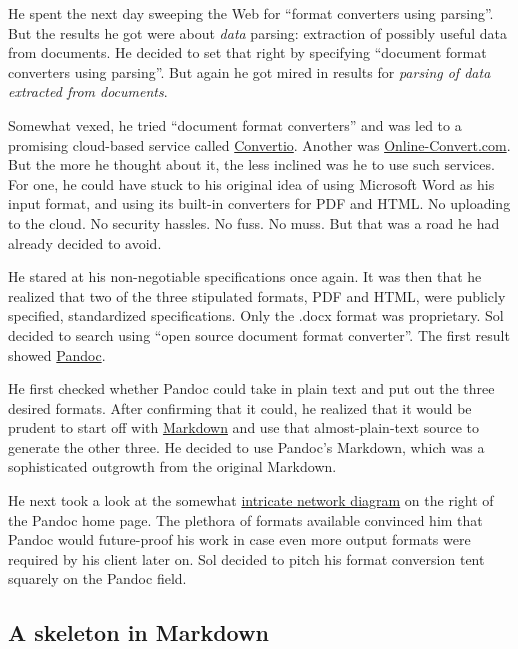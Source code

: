\documentclass[
  british,
  a4paper,
  rgb,
  dvipsnames,
  svgnames,
  hyphens]{article}
\begin{document}
He spent the next day sweeping the Web for ``format converters using
parsing''. But the results he got were about \emph{data} parsing:
extraction of possibly useful data from documents. He decided to set
that right by specifying ``document format converters using parsing''.
But again he got mired in results for \emph{parsing of data extracted
from documents}.

Somewhat vexed, he tried ``document format converters'' and was led to a
promising cloud-based service called
\href{https://convertio.co/document-converter/}{Convertio}. Another was
\href{https://document.online-convert.com/}{Online-Convert.com}. But the
more he thought about it, the less inclined was he to use such services.
For one, he could have stuck to his original idea of using Microsoft
Word as his input format, and using its built-in converters for PDF and
HTML. No uploading to the cloud. No security hassles. No fuss. No muss.
But that was a road he had already decided to avoid.

He stared at his non-negotiable specifications once again. It was then
that he realized that two of the three stipulated formats, PDF and HTML,
were publicly specified, standardized specifications. Only the .docx
format was proprietary. Sol decided to search using ``open source
document format converter''. The first result showed
\href{https://pandoc.org/}{Pandoc}.

He first checked whether Pandoc could take in plain text and put out the
three desired formats. After confirming that it could, he realized that
it would be prudent to start off with
\href{https://daringfireball.net/projects/markdown/}{Markdown} and use
that almost-plain-text source to generate the other three. He decided to
use Pandoc's Markdown, which was a sophisticated outgrowth from the
original Markdown.

He next took a look at the somewhat
\href{https://pandoc.org/diagram.svg}{intricate network diagram} on the
right of the Pandoc home page. The plethora of formats available
convinced him that Pandoc would future-proof his work in case even more
output formats were required by his client later on. Sol decided to
pitch his format conversion tent squarely on the Pandoc field.

\hypertarget{a-skeleton-in-markdown}{%
\subsection{A skeleton in Markdown}\label{a-skeleton-in-markdown}}
\end{document}
